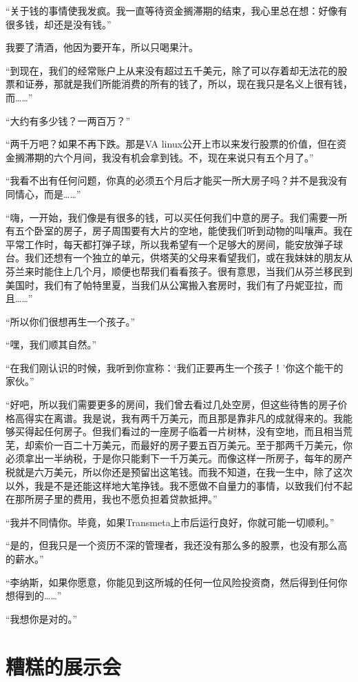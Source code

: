 “关于钱的事情使我发疯。我一直等待资金搁滞期的结束，我心里总在想：好像有很多钱，却还是没有钱。”

我要了清酒，他因为要开车，所以只喝果汁。

“到现在，我们的经常账户上从来没有超过五千美元，除了可以存着却无法花的股票和证券，那就是我们所能消费的所有的钱了，所以，现在我只是名义上很有钱，而……”

“大约有多少钱？一两百万？”

“两千万吧？如果不再下跌。那是VA linux公开上市以来发行股票的价值，但在资金搁滞期的六个月间，我没有机会拿到钱。不，现在来说只有五个月了。”

“我看不出有任何问题，你真的必须五个月后才能买一所大房子吗？并不是我没有同情心，而是……”

“嗨，一开始，我们像是有很多的钱，可以买任何我们中意的房子。我们需要一所有五个卧室的房子，房子周围要有大片的空地，能使我们听到动物的叫嚷声。我在平常工作时，每天都打弹子球，所以我希望有一个足够大的房间，能安放弹子球台。我们还想有一个独立的单元，供塔芙的父母来看望我们，或在我妹妹的朋友从芬兰来时能住上几个月，顺便也帮我们看看孩子。很有意思，当我们从芬兰移民到美国时，我们有了帕特里夏，当我们从公寓搬入套房时，我们有了丹妮亚拉，而且……”

“所以你们很想再生一个孩子。”

“嘿，我们顺其自然。”

“在我们刚认识的时候，我听到你宣称：‘我们正要再生一个孩子！’你这个能干的家伙。”

“好吧，所以我们需要更多的房间，我们曾去看过几处空房，但这些待售的房子价格高得实在离谱。我是说，我有两千万美元，而且那是靠非凡的成就得来的。我能够买得起任何房子。但我们看过的一座房子临着一片树林，没有空地，而且相当荒芜，却索价一百二十万美元，而最好的房子要五百万美元。至于那两千万美元，你必须拿出一半纳税，于是你只能剩下一千万美元。而像这样一所房子，每年的房产税就是六万美元，所以你还是预留出这笔钱。而我不知道，在我一生中，除了这次以外，我是不是还能这样地大笔挣钱。我不愿做不自量力的事情，以致我们付不起在那所房子里的费用，我也不愿负担着贷款抵押。”

“我并不同情你。毕竟，如果Transmeta上市后运行良好，你就可能一切顺利。”

“是的，但我只是一个资历不深的管理者，我还没有那么多的股票，也没有那么高的薪水。”

“李纳斯，如果你愿意，你能见到这所城的任何一位风险投资商，然后得到任何你想得到的……”

“我想你是对的。”

 
\section{糟糕的展示会}

